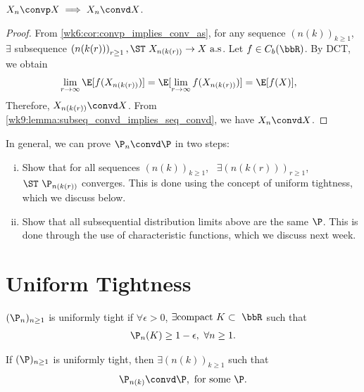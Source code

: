 \documentclass[../aipt.tex]{subfiles}
\begin{document}
\begin{Lemma}\label{wk9:lem:convpd}
$X_n \convp X \implies X_n \convd X$.
\end{Lemma}
\begin{proof}
From \cref{wk6:cor:convp_implies_conv_as}, for any sequence $\left(n(k)\right)_{k \geq 1}$, $\exists$ subsequence $\left(n(k(r))\right)_{r \geq 1}, \ST\ X_{n(k(r))} \to X \ \text{a.s}$. Let $f \in C_b(\bbR)$. By DCT, we obtain
\begin{align*}
&\lim_{r \to \infty} \E[f(X_{n(k(r))})] 
= \E[\lim_{r \to \infty} f(X_{n(k(r))})] 
= \E[f(X)],
\end{align*}
Therefore, $X_{n(k(r))} \convd X$. From \cref{wk9:lemma:subseq_convd_implies_seq_convd}, we have $X_n \convd X$.
\end{proof}


In general, we can prove $\P_n \convd \P$ in two steps:
\begin{enumerate}[(i)]
\item Show that for all sequences $\left(n(k)\right)_{k \geq 1}$, \ $\exists \left(n(k(r))\right)_{r \geq 1}$, \ $\ST\ \P_{n(k(r))}$ converges. This is done using the concept of uniform tightness, which we discuss below.
\item Show that all subsequential distribution limits above are the same $\P$. This is done through the use of characteristic functions, which we discuss next week.
\end{enumerate}

\section{Uniform Tightness}

\begin{Definition}
$(\P_n)_{n \geq 1}$ is uniformly tight if $\forall \epsilon > 0$, $\exists \text{compact}\ K \subset\ \bbR$ such that
\begin{align*}
\P_n(K) \geq 1 - \epsilon, \ \forall n \geq 1.
\end{align*}
\end{Definition}
%
\begin{Theorem}\label{wk9:thm:Helly}
If $(\P)_{n \geq 1}$ is uniformly tight, then $\exists \left(n(k)\right)_{k \geq 1}$ such that
\begin{align*}
\P_{n(k)} \convd \P, \ \text{for some}\ \P.
\end{align*}
\end{Theorem}
\end{document}

